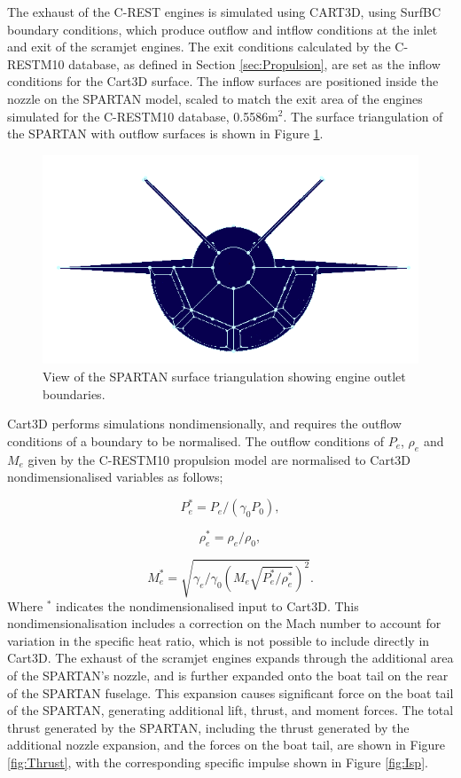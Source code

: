 The exhaust of the C-REST engines is simulated using CART3D, using SurfBC boundary conditions, which produce outflow and intflow conditions at the inlet and exit of the scramjet engines\cite{Pandya2004}. The exit conditions calculated by the C-RESTM10 database, as defined in Section \ref{sec:Propulsion}, are set as the inflow conditions for the Cart3D surface. 
The inflow surfaces are positioned inside the nozzle on the SPARTAN model, scaled to match the exit area of the engines simulated for the C-RESTM10 database, 0.5586m$^2$. The surface triangulation of the SPARTAN with outflow surfaces is shown in Figure \ref{fig:Pointwise-EngineBC}.
\begin{figure}[ht]
	\centering
	\includegraphics[width=0.7\linewidth]{figures/3_vehicle_design/Pointwise-EngineBC}
	\caption{View of the SPARTAN surface triangulation showing engine outlet boundaries.}
	\label{fig:Pointwise-EngineBC}
\end{figure}
Cart3D performs simulations nondimensionally, and requires the outflow conditions of a boundary to be normalised. The outflow conditions of $P_e$, $\rho_e$ and $M_e$ given by the C-RESTM10 propulsion model are normalised to Cart3D nondimensionalised variables as follows\cite{Cartplumes,Mehta2015};

\begin{equation}
P_e^* = P_e/(\gamma_0 P_0),
\end{equation}

\begin{equation}
\rho_e^* = \rho_e/\rho_0,
\end{equation}

\begin{equation}
M_e^* = \sqrt{\gamma_e/\gamma_0 (M_e \sqrt{ P_e^*/\rho_e^*})^2}.
\end{equation}
Where $^*$ indicates the nondimensionalised input to Cart3D. This nondimensionalisation includes a correction on the Mach number to account for variation in the specific heat ratio, which is not possible to include directly in Cart3D\cite{Mehta2016}. The exhaust of the scramjet engines expands through the additional area of the SPARTAN's nozzle, and is further expanded onto the boat tail on the rear of the SPARTAN fuselage. This expansion causes significant force on the boat tail of the SPARTAN, generating additional lift, thrust, and moment forces. The total thrust generated by the SPARTAN, including the thrust generated by the additional nozzle expansion, and the forces on the boat tail, are shown in Figure \ref{fig:Thrust}, with the corresponding specific impulse shown in Figure \ref{fig:Isp}.



